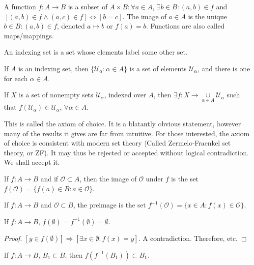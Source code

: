 \documentclass[crop=false,class=book]{standalone}
\begin{document}
\begin{definition}
A function $f:A\rightarrow B$ is a subset of $A\times B: \forall a\in A$, $\exists b\in B: (a,b)\in f$ and $[(a,b)\in f\land (a,c)\in f]\Leftrightarrow [b=c]$. The image of $a\in A$ is the unique $b\in B:(a,b)\in f$, denoted $a\mapsto b$ or $f(a)=b$. Functions are also called maps/mappings.
\end{definition}
\begin{definition}
An indexing set is a set whose elements label some other set.
\end{definition}
\begin{example}
If $A$ is an indexing set, then $\{\mathcal{U}_{\alpha}:\alpha \in A\}$ is a set of elements $\mathcal{U}_{\alpha}$, and there is one for each $\alpha \in A$.
\end{example}
\begin{axiom}
If $X$ is a set of nonempty sets $\mathcal{U}_{\alpha}$, indexed over $A$, then $\exists f:X\rightarrow \underset{\alpha \in A}\cup \mathcal{U}_{\alpha}$ such that $f(\mathcal{U}_{\alpha}) \in \mathcal{U}_{\alpha}$, $\forall \alpha\in A$.
\end{axiom}
\begin{remark}
This is called the axiom of choice. It is a blatantly obvious statement, however many of the results it gives are far from intuitive. For those interested, the axiom of choice is consistent with modern set theory (Called Zermelo-Fraenkel set theory, or ZF). It may thus be rejected or accepted without logical contradiction. We shall accept it.
\end{remark}
\begin{definition}
If $f:A\rightarrow B$ and if $\mathcal{O}\subset A$, then the image of $\mathcal{O}$ under $f$ is the set $f(\mathcal{O}) = \{f(a)\in B:a\in \mathcal{O}\}$.
\end{definition}
\begin{definition}
If $f:A\rightarrow B$ and $\mathscr{O}\subset B$, the preimage is the set $f^{-1}(\mathscr{O}) = \{x\in A:f(x)\in \mathscr{O}\}$.
\end{definition}
\begin{corollary}
If $f:A\rightarrow B$, $f(\emptyset) = f^{-1}(\emptyset) = \emptyset$.
\end{corollary}
\begin{proof}
$[y\in f(\emptyset)]\Rightarrow [\exists x\in \emptyset:f(x)=y]$. A contradiction. Therefore, etc.
\end{proof}
\begin{theorem}
If $f:A\rightarrow B$, $B_1\subset B$, then $f(f^{-1}(B_1))\subset B_1$.
\end{theorem}
\end{document}
